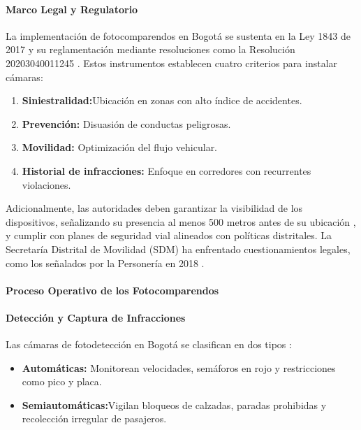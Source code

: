 \paragraph{Marco Legal y Regulatorio} La implementación de fotocomparendos en Bogotá se sustenta en la Ley 1843 de 2017 \parencite{ley1843} y su reglamentación mediante resoluciones como la Resolución 20203040011245 \parencite{resolucion11245}. Estos instrumentos establecen cuatro criterios para instalar cámaras: 

\begin{enumerate}
    \item \textbf{Siniestralidad:}Ubicación en zonas con alto índice de accidentes. 
    \item \textbf{Prevención:} Disuasión de conductas peligrosas. 
    \item \textbf{Movilidad: } Optimización del flujo vehicular.
        \item \textbf{Historial de infracciones:} Enfoque en corredores con recurrentes violaciones.
\end{enumerate}

Adicionalmente, las autoridades deben garantizar la visibilidad de los dispositivos, señalizando su presencia al menos 500 metros antes de su ubicación \parencite{ley1843}, y cumplir con planes de seguridad vial alineados con políticas distritales. La Secretaría Distrital de Movilidad (SDM) ha enfrentado cuestionamientos legales, como los señalados por la Personería en 2018 \parencite{sdm_camaras2023}.

\paragraph{Proceso Operativo de los Fotocomparendos }
\paragraph{Detección y Captura de Infracciones }
Las cámaras de fotodetección en Bogotá se clasifican en dos tipos \parencite{supertransporte2021, mintransporte2023}: 

\begin{itemize}
    \item \textbf{Automáticas: }Monitorean velocidades, semáforos en rojo y restricciones como pico y placa.
    \item \textbf{Semiautomáticas:}Vigilan bloqueos de calzadas, paradas prohibidas y recolección irregular de pasajeros.
\end{itemize}

